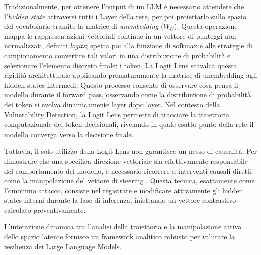 Tradizionalmente, per ottenere l'output di un LLM è necessario attendere che l'\textit{hidden state} attraversi tutti i Layer della rete, per poi proiettarlo sullo spazio del vocabolario tramite la matrice di \textit{unembedding} ($W_U$). Questa operazione mappa le rappresentazioni vettoriali continue in un vettore di punteggi non normalizzati, definiti \textit{logits}; spetta poi alla funzione di softmax e alle strategie di campionamento convertire tali valori in una distribuzione di probabilità e selezionare l'elemento discreto finale: i token. La Logit Lens \cite{bereska2024mechanisticinterpretabilityaisafety} scavalca questa rigidità architetturale applicando prematuramente la matrice di unembedding agli hidden states intermedi. Questo processo consente di osservare cosa pensa il modello durante il forward pass, osservando come la distribuzione di probabilità dei token si evolva dinamicamente layer dopo layer. Nel contesto della Vulnerability Detection, la Logit Lens permette di tracciare la traiettoria computazionale dei token decisionali, rivelando in quale esatto punto della rete il modello converga verso la decisione finale.

Tuttavia, il solo utilizzo della Logit Lens non garantisce un nesso di causalità. Per dimostrare che una specifica direzione vettoriale sia effettivamente responsabile del comportamento del modello, è necessario ricorrere a interventi causali diretti come la manipolazione del vettore di steering \cite{zou2025representationengineeringtopdownapproach}. Questa tecnica, esattamente come l'omonimo attacco, consiste nel registrare e modificare attivamente gli hidden states interni durante la fase di inferenza, iniettando un vettore contrastivo calcolato preventivamente. 

L'interazione dinamica tra l'analisi della traiettoria e la manipolazione attiva dello spazio latente fornisce un framework analitico robusto per valutare la resilienza dei Large Language Models.